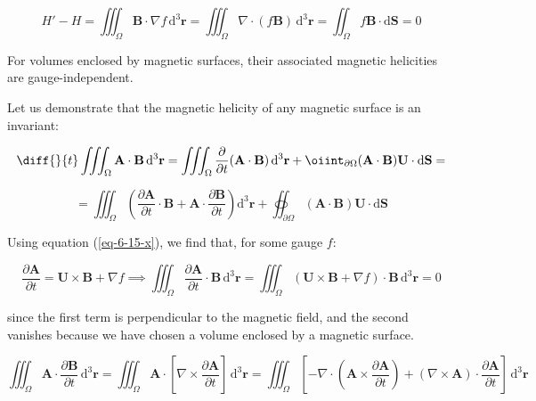 \begin{equation}
    H'-H=\iiint_\Omega\mathbf{B}\cdot\nabla f\,\mathrm{d}^3\mathbf{r}=\iiint_\Omega\nabla\cdot(f\mathbf{B})\,\mathrm{d}^3\mathbf{r}=\iint_\Omega f\mathbf{B}\cdot\mathrm{d}\mathbf{S}=0
\end{equation}

For volumes enclosed by magnetic surfaces, their associated magnetic helicities are gauge-independent.

\quad Let us demonstrate that the magnetic helicity of any magnetic surface is an invariant:

\begin{equation}
    \diff{}{t}\iiint_\Omega\mathbf{A}\cdot\mathbf{B}\,\mathrm{d}^3\mathbf{r}=\iiint_\Omega\frac{\partial}{\partial t}(\mathbf{A}\cdot\mathbf{B})\,\mathrm{d}^3\mathbf{r}+\oiint_{\partial\Omega}(\mathbf{A}\cdot\mathbf{B})\mathbf{U}\cdot\mathrm{d}\mathbf{S}=
\end{equation}

\begin{equation}
    =\iiint_\Omega\left(\frac{\partial\mathbf{A}}{\partial t}\cdot\mathbf{B}+\mathbf{A}\cdot\frac{\partial\mathbf{B}}{\partial t}\right)\mathrm{d}^3\mathbf{r}+\oiint_{\partial\Omega}(\mathbf{A}\cdot\mathbf{B})\mathbf{U}\cdot\mathrm{d}\mathbf{S}
\end{equation}

Using equation (\ref{eq-6-15-x}), we find that, for some gauge $f$:

\begin{equation}
    \label{eq-6-27}
    \frac{\partial\mathbf{A}}{\partial t}=\mathbf{U}\times\mathbf{B}+\nabla f\implies\iiint_\Omega\frac{\partial\mathbf{A}}{\partial t}\cdot\mathbf{B}\,\mathrm{d}^3\mathbf{r}=\iiint_\Omega\left(\mathbf{U}\times\mathbf{B}+\nabla f\right)\cdot\mathbf{B}\,\mathrm{d}^3\mathbf{r}=0
\end{equation}

since the first term is perpendicular to the magnetic field, and the second vanishes because we have chosen a volume enclosed by a magnetic surface.

\begin{equation}
    \iiint_\Omega\mathbf{A}\cdot\frac{\partial\mathbf{B}}{\partial t}\,\mathrm{d}^3\mathbf{r}=\iiint_\Omega\mathbf{A}\cdot\left[\nabla\times\frac{\partial\mathbf{A}}{\partial t}\right]\,\mathrm{d}^3\mathbf{r}=\iiint_\Omega\left[-\nabla\cdot\left(\mathbf{A}\times\frac{\partial\mathbf{A}}{\partial t}\right)+(\nabla\times\mathbf{A})\cdot\frac{\partial\mathbf{A}}{\partial t}\right]\,\mathrm{d}^3\mathbf{r}
\end{equation}

